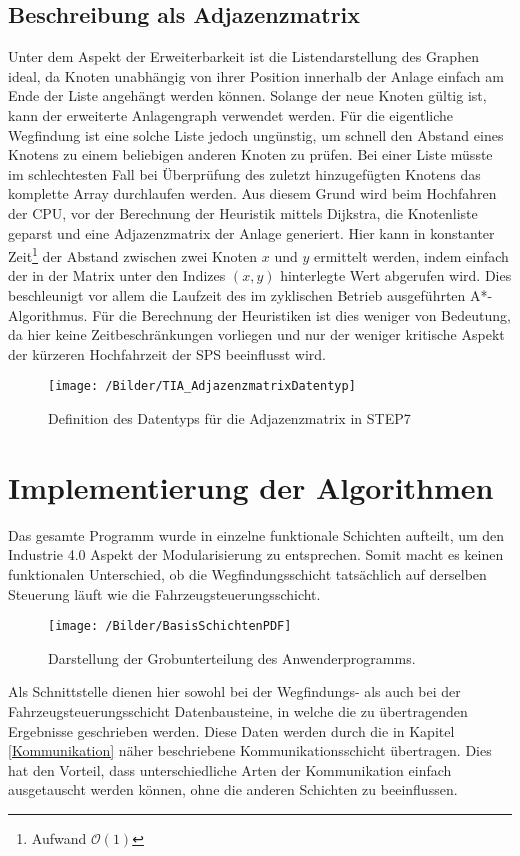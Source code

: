 		\subsection{Beschreibung als Adjazenzmatrix}
			\label{Adjazenzmatrix}
			Unter dem Aspekt der Erweiterbarkeit ist die Listendarstellung des Graphen ideal, da Knoten unabhängig von ihrer Position innerhalb der Anlage einfach am Ende der Liste angehängt werden können. Solange der neue Knoten gültig ist, kann der erweiterte Anlagengraph verwendet werden. Für die eigentliche Wegfindung ist eine solche Liste jedoch ungünstig, um schnell den Abstand eines Knotens zu einem beliebigen anderen Knoten zu prüfen. Bei einer Liste müsste im schlechtesten Fall bei Überprüfung des zuletzt hinzugefügten Knotens das komplette Array durchlaufen werden. Aus diesem Grund wird beim Hochfahren der CPU, vor der Berechnung der Heuristik mittels Dijkstra, die Knotenliste geparst und eine Adjazenzmatrix der Anlage generiert. Hier kann in konstanter Zeit\footnote{Aufwand $\mathcal{O}(1)$} der Abstand zwischen zwei Knoten $x$ und $y$ ermittelt werden, indem einfach der in der Matrix unter den Indizes $(x,y)$ hinterlegte Wert abgerufen wird. Dies beschleunigt vor allem die Laufzeit des im zyklischen Betrieb ausgeführten A*-Algorithmus. Für die Berechnung der Heuristiken ist dies weniger von Bedeutung, da hier keine Zeitbeschränkungen vorliegen und nur der weniger kritische Aspekt der kürzeren Hochfahrzeit der \ac{SPS} beeinflusst wird.
			
			\begin{figure}
				\centering
				\texttt{[image: /Bilder/TIA\_AdjazenzmatrixDatentyp]}
				\vspace{0.2cm}
				\caption{Definition des Datentyps für die Adjazenzmatrix in \ac{STEP7}}
			\end{figure}

	\section{Implementierung der Algorithmen}
		
	
		Das gesamte Programm wurde in einzelne funktionale Schichten aufteilt, um den Industrie 4.0 Aspekt der Modularisierung zu entsprechen. Somit macht es keinen funktionalen Unterschied, ob die Wegfindungsschicht tatsächlich auf derselben Steuerung läuft wie die Fahrzeugsteuerungsschicht.
		\begin{wrapfigure}{r}{5cm}
			\centering
			\texttt{[image: /Bilder/BasisSchichtenPDF]}
			\vspace{0.2cm}
			\caption{Darstellung der Grobunterteilung des Anwenderprogramms.}
		\end{wrapfigure}
		 Als Schnittstelle dienen hier sowohl bei der Wegfindungs- als auch bei der Fahrzeugsteuerungsschicht  Datenbausteine, in welche die zu übertragenden Ergebnisse geschrieben werden. Diese Daten werden durch die in Kapitel \ref{Kommunikation} näher beschriebene Kommunikationsschicht übertragen. Dies hat den Vorteil, dass unterschiedliche Arten der Kommunikation einfach ausgetauscht werden können, ohne die anderen Schichten zu beeinflussen.
		
